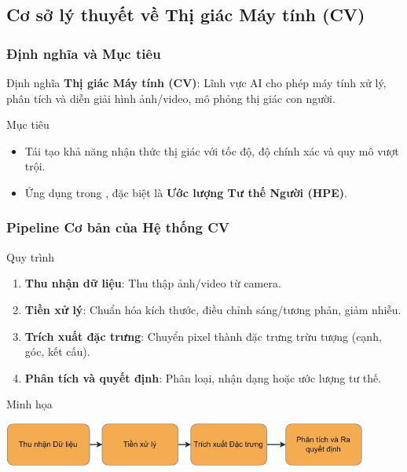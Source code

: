 \subsection{Cơ sở lý thuyết về Thị giác Máy tính (CV)}
\begin{frame}
\frametitle{Định nghĩa và Mục tiêu}
\begin{block}{Định nghĩa}
\textbf{Thị giác Máy tính (CV)}: Lĩnh vực AI cho phép máy tính xử lý, phân tích và diễn giải hình ảnh/video, mô phỏng thị giác con người.
\end{block}

\begin{block}{Mục tiêu}
\begin{itemize}
\item Tái tạo khả năng nhận thức thị giác với tốc độ, độ chính xác và quy mô vượt trội.
\item Ứng dụng trong \TENLUANVAN, đặc biệt là \textbf{Ước lượng Tư thế Người (HPE)}.
\end{itemize}
\end{block}
\end{frame}

\begin{frame}
\frametitle{Pipeline Cơ bản của Hệ thống CV}
\begin{block}{Quy trình}
\begin{enumerate}
\item \textbf{Thu nhận dữ liệu}: Thu thập ảnh/video từ camera.
\item \textbf{Tiền xử lý}: Chuẩn hóa kích thước, điều chỉnh sáng/tương phản, giảm nhiễu.
\item \textbf{Trích xuất đặc trưng}: Chuyển pixel thành đặc trưng trừu tượng (cạnh, góc, kết cấu).
\item \textbf{Phân tích và quyết định}: Phân loại, nhận dạng hoặc ước lượng tư thế.
\end{enumerate}
\end{block}

\begin{exampleblock}{Minh họa}
\begin{center}
\includegraphics[width=0.9\textwidth]{images/vision_flow-crop.pdf}
\caption{Quy trình tổng thể của hệ thống CV.}
\label{fig:cv_pipeline}
\end{center}
\end{exampleblock}
\end{frame}

